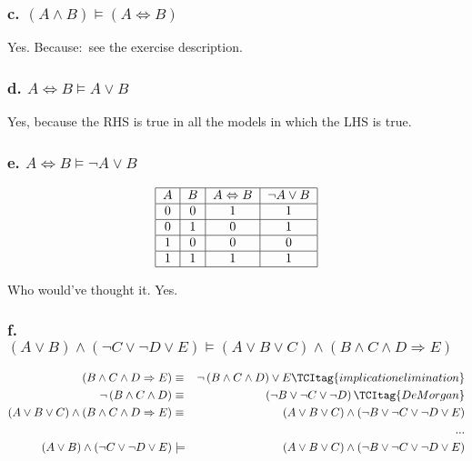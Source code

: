 \documentclass{article}
\begin{document}
\subsubsection{c. $\left( A\wedge B\right) \models \left( A\Leftrightarrow
B\right) $}

Yes. Because:\ see the exercise description.

\subsubsection{d. $A\Leftrightarrow B\models A\vee B$}

Yes, because the RHS is true in all the models in which the LHS is true.

\subsubsection{e. $A\Leftrightarrow B\models \lnot A\vee B$}

\[
\begin{tabular}{|c|c|c|c|}
\hline
$A$ & $B$ & $A\Leftrightarrow B$ & $\lnot A\vee B$ \\ \hline
0 & 0 & 1 & 1 \\ \hline
0 & 1 & 0 & 1 \\ \hline
1 & 0 & 0 & 0 \\ \hline
1 & 1 & 1 & 1 \\ \hline
\end{tabular}%
\]

Who would've thought it. Yes.

\subsubsection{f. $\left( A\vee B\right) \wedge \left( \lnot C\vee \lnot
D\vee E\right) \models \left( A\vee B\vee C\right) \wedge \left( B\wedge
C\wedge D\Rightarrow E\right) $}

\begin{eqnarray}
\left( B\wedge C\wedge D\Rightarrow E\right) &\equiv &\lnot \left( B\wedge
C\wedge D\right) \vee E  \TCItag{implication elimination} \\
\lnot \left( B\wedge C\wedge D\right) &\equiv &\left( \lnot B\vee \lnot
C\vee \lnot D\right)  \TCItag{De Morgan} \\
\left( A\vee B\vee C\right) \wedge \left( B\wedge C\wedge D\Rightarrow
E\right) &\equiv &\left( A\vee B\vee C\right) \wedge \left( \lnot B\vee
\lnot C\vee \lnot D\vee E\right)  \nonumber \\
&&...  \nonumber \\
\left( A\vee B\right) \wedge \left( \lnot C\vee \lnot D\vee E\right)
&\models &\left( A\vee B\vee C\right) \wedge \left( \lnot B\vee \lnot C\vee
\lnot D\vee E\right)  \nonumber
\end{eqnarray}
\end{document}
